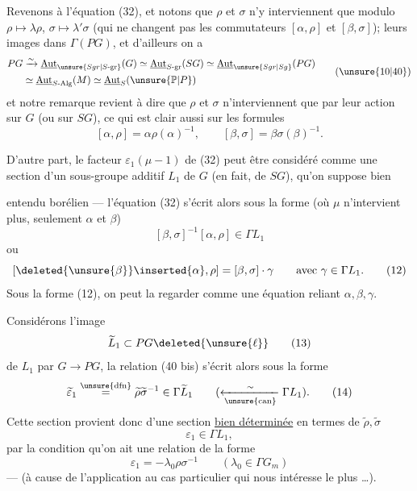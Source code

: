 Revenons à l'équation (32), et notons que $\rho$ et $\sigma$ n'y interviennent que modulo  $\rho\mapsto\lambda\rho$, $\sigma\mapsto\lambda'\sigma$  (qui ne changent pas les commutateurs $[\alpha,\rho]$ et $[\beta,\sigma]$);    leurs images dans $\Gamma(PG)$, et d'ailleurs on a
\[
\begin{aligned}
PG&\xrightarrow{\sim}\underline{\mathrm{Aut}}_{\unsure{Sgr|S\text{-gr}}}(G)
\simeq\underline{\mathrm{Aut}}_{S\text{-gr}}(SG)
\simeq\underline{\mathrm{Aut}}_{\unsure{Sgr|Sg}}(PG)\\
&\simeq\underline{\mathrm{Aut}}_{S\text{-Alg}}(M)
\simeq\underline{\mathrm{Aut}}_S(\unsure{\mathbb P|P})
\end{aligned} \tag{\unsure{10|40}}
\]
et notre remarque revient à dire que $\rho$ et $\sigma$ n'interviennent que par leur action sur $G$ (ou sur $SG$), ce qui est clair aussi sur les formules
\[
[\alpha,\rho]=\alpha\rho(\alpha)^{-1},\qquad
[\beta,\sigma]=\beta\sigma(\beta)^{-1}.
\]

D'autre part, le facteur $\varepsilon_1(\mu-1)$ de (32) peut être considéré comme une section d'un  sous-groupe additif $L_1$ de $G$ (en fait, de $SG$), qu'on suppose bien


entendu borélien --- l'équation (32) s'écrit alors sous la forme (où $\mu$ n'intervient plus, seulement $\alpha$ et $\beta$)
\[
[\beta,\sigma]^{-1}[\alpha,\rho]\in\Gamma L_1 \tag{11}
\]
ou
\[
[\deleted{\unsure{\beta}}\inserted{\alpha},\rho]=[\beta,\sigma]\cdot\gamma
\qquad\text{avec }\gamma\in\Gamma L_1. \tag{12}
\]
Sous la forme (12), on peut la regarder comme une équation reliant $\alpha,\beta,\gamma$.

Considérons l'image 
\[
\widetilde L_1\subset PG\deleted{\unsure{\ell}} \tag{13}
\]
de $L_1$ par $G\longrightarrow PG$, la relation (40 bis) s'écrit alors sous la forme
\[
\widetilde\varepsilon_1\overset{\unsure{\mathrm{dfn}}}{=}
\widetilde\rho\widetilde\sigma^{-1}\in\Gamma\widetilde L_1
\qquad(\xleftarrow[\unsure{\mathrm{can}}]{\sim}\Gamma L_1). \tag{14}
\]
Cette section provient donc d'une section \uline{bien déterminée}  en termes de $\widetilde\rho,\widetilde\sigma$
\[
\varepsilon_1\in\Gamma L_1, \tag{15}
\]
 par la condition qu'on ait une relation de la forme
\[
\varepsilon_1=-\lambda_0\rho\sigma^{-1}
\qquad(\lambda_0\in\Gamma G_m) \tag*{(16) = (40 bis)}
\]
 --- (à cause de l'application au cas particulier qui nous intéresse le plus \ldots).

